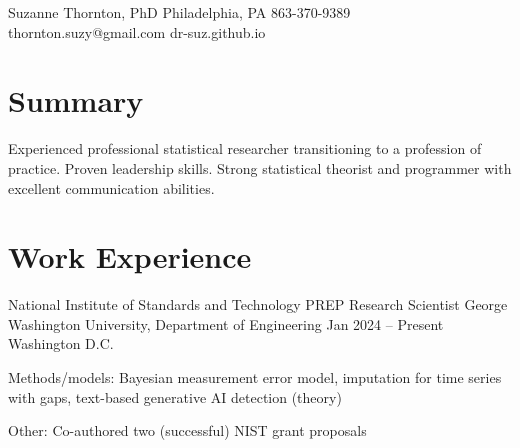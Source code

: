 \documentclass[letterpaper]{resume_config}
\begin{document}
\Header
    {Suzanne Thornton, PhD}  
    {Philadelphia, PA} 
    {863-370-9389}  
    {thornton.suzy@gmail.com} 
    {dr-suz.github.io} \

\section{Summary}
Experienced professional statistical researcher transitioning to a profession of practice. Proven leadership skills. Strong statistical theorist and programmer with excellent communication abilities. %


\section{Work Experience}
\WorkExperience
    {National Institute of Standards and Technology PREP Research Scientist}  
    {George Washington University, Department of Engineering}  
    {Jan 2024 -- Present}  
    {Washington D.C.}  
    {
        \item Methods/models: Bayesian measurement error model, imputation for time series with gaps, text-based generative AI detection (theory)
        \item Other: Co-authored two (successful) NIST grant proposals 
    } 
    
\end{document}
